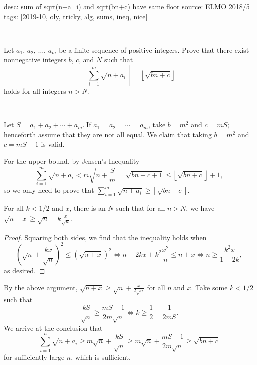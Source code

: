 desc: sum of sqrt(n+a_i) and sqrt(bn+c) have same floor
source: ELMO 2018/5
tags: [2019-10, oly, tricky, alg, sums, ineq, nice]

---

Let $a_1$, $a_2$, $\ldots$, $a_m$ be a finite sequence of positive integers. Prove that there exist nonnegative integers $b$, $c$, and $N$ such that \[\left\lfloor\sum_{i=1}^m\sqrt{n+a_i}\right\rfloor=\left\lfloor\sqrt{bn+c}\right\rfloor\]
holds for all integers $n>N$.

---

Let $S=a_1+a_2+\cdots+a_m$. If $a_1=a_2=\cdots=a_m$, take $b=m^2$ and $c=mS$; henceforth assume that they are not all equal. We claim that taking $b=m^2$ and $c=mS-1$ is valid.

For the upper bound, by Jensen's Inequality \[\sum_{i=1}^m\sqrt{n+a_i}<m\sqrt{n+\frac Sm}=\sqrt{bn+c+1}\le\left\lfloor\sqrt{bn+c}\right\rfloor+1,\]
so we only need to prove that $\sum_{i=1}^m\sqrt{n+a_i}\ge\left\lfloor\sqrt{bn+c}\right\rfloor$.
\begin{claim*}
    For all $k<1/2$ and $x$, there is an $N$ such that for all $n>N$, we have $\sqrt{n+x}\ge\sqrt n+k\frac x{\sqrt n}$.
\end{claim*}
\begin{proof}
Squaring both sides, we find that the inequality holds when\[\left(\sqrt n+\frac{kx}{\sqrt n}\right)^2\le\left(\sqrt{n+x}\right)^2\iff n+2kx+k^2\frac{x^2}n\le n+x\iff n\ge\frac{k^2x}{1-2k},\]
    as desired.
\end{proof}

By the above argument, $\sqrt{n+x}\ge\sqrt n+\frac x{2\sqrt n}$ for all $n$ and $x$. Take some $k<1/2$ such that \[\frac{kS}{\sqrt n}\ge\frac{mS-1}{2m\sqrt n}\iff k\ge\frac12-\frac1{2mS}.\]
We arrive at the conclusion that \[\sum_{i=1}^n\sqrt{n+a_i}\ge m\sqrt n+\frac{kS}{\sqrt n}\ge m\sqrt n+\frac{mS-1}{2m\sqrt n}\ge\sqrt{bn+c}\]
for sufficiently large $n$, which is sufficient.
